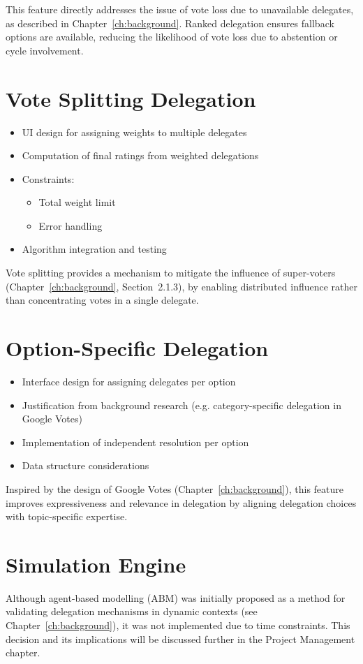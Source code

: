 This feature directly addresses the issue of vote loss due to unavailable delegates, as described in Chapter~\ref{ch:background}. Ranked delegation ensures fallback options are available, reducing the likelihood of vote loss due to abstention or cycle involvement.

\section{Vote Splitting Delegation}
\begin{itemize}
  \item UI design for assigning weights to multiple delegates
  \item Computation of final ratings from weighted delegations
  \item Constraints:
  \begin{itemize}
    \item Total weight limit
    \item Error handling
  \end{itemize}
  \item Algorithm integration and testing
\end{itemize}

Vote splitting provides a mechanism to mitigate the influence of super-voters (Chapter~\ref{ch:background}, Section~2.1.3), by enabling distributed influence rather than concentrating votes in a single delegate.

\section{Option-Specific Delegation}
\begin{itemize}
  \item Interface design for assigning delegates per option
  \item Justification from background research (e.g. category-specific delegation in Google Votes)
  \item Implementation of independent resolution per option
  \item Data structure considerations
\end{itemize}

Inspired by the design of Google Votes (Chapter~\ref{ch:background}), this feature improves expressiveness and relevance in delegation by aligning delegation choices with topic-specific expertise.

\section{Simulation Engine}
Although agent-based modelling (ABM) was initially proposed as a method for validating delegation mechanisms in dynamic contexts (see Chapter~\ref{ch:background}), it was not implemented due to time constraints. This decision and its implications will be discussed further in the Project Management chapter.

